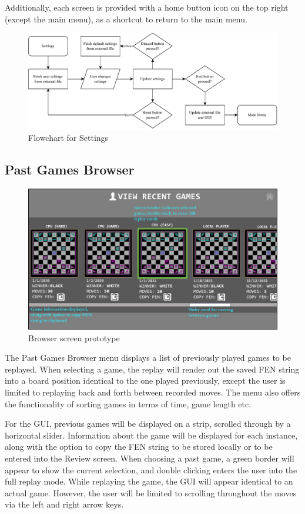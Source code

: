 \documentclass[../main/main.tex]{subfiles}
\begin{document}
Additionally, each screen is provided with a home button icon on the top right (except the main menu), as a shortcut to return to the main menu.

\begin{figure}[H]
    \centering
    \includegraphics[width=\columnwidth]{../design/assets/settings_flowchart.pdf}
    \caption{Flowchart for Settings}
    \label{fig:settings-flowchart}
\end{figure}

\subsection{Past Games Browser}
\begin{figure}[H]
    \centering
    \includegraphics[width=0.8\columnwidth]{../design/assets/browser_gui.png}
    \caption{Browser screen prototype}
    \label{fig:browser-gui}
\end{figure}

The Past Games Browser menu displays a list of previously played games to be replayed. When selecting a game, the replay will render out the saved FEN string into a board position identical to the one played previously, except the user is limited to replaying back and forth between recorded moves. The menu also offers the functionality of sorting games in terms of time, game length etc.

For the GUI, previous games will be displayed on a strip, scrolled through by a horizontal slider. Information about the game will be displayed for each instance, along with the option to copy the FEN string to be stored locally or to be entered into the Review screen. When choosing a past game, a green border will appear to show the current selection, and double clicking enters the user into the full replay mode.
While replaying the game, the GUI will appear identical to an actual game. However, the user will be limited to scrolling throughout the moves via the left and right arrow keys.
\end{document}
